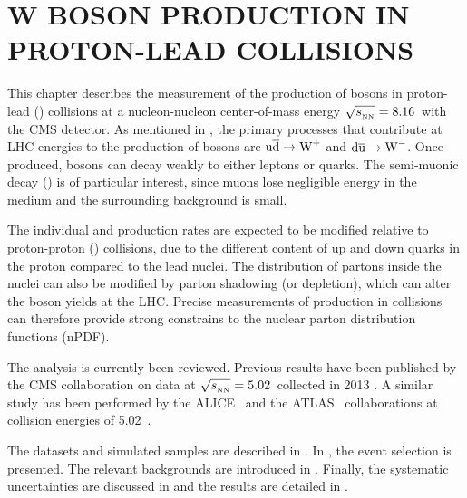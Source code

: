 \let\textcircled=\pgftextcircled
\chapter{W BOSON PRODUCTION IN PROTON-LEAD COLLISIONS} \label{sec:WBoson}


This chapter describes the measurement of the production of \W bosons in proton-lead (\pPb) collisions at a nucleon-nucleon center-of-mass energy $\sqrtsnn = 8.16$~\TeV with the CMS detector. As mentioned in , the primary processes that contribute at LHC energies to the production of \W bosons are $\text{u} \overline{\text{d}} \rightarrow \text{W}^+$ and $\text{d} \overline{\text{u}} \rightarrow \text{W}^-$. Once produced, \W bosons can decay weakly to either leptons or quarks. The semi-muonic decay (\WToMuNu) is of particular interest, since muons lose negligible energy in the medium and the surrounding background is small.

The individual \Wp and \Wm production rates are expected to be modified relative to proton-proton (\pp) collisions, due to the different content of up and down quarks in the proton compared to the lead nuclei. The distribution of partons inside the nuclei can also be modified by parton shadowing (or depletion), which can alter the \W boson yields at the LHC. Precise measurements of \W production in \pPb collisions can therefore provide strong constrains to the nuclear parton distribution functions (nPDF).

The analysis is currently been reviewed. Previous results have been published by the CMS collaboration on \pPb data at $\sqrtsnn = 5.02$~\TeV collected in 2013 \cite{HIN-13-007}. A similar study has been performed by the ALICE~\cite{ALICE_pPb_W_5TeV} and the ATLAS~\cite{ATLAS_pPb_W_5TeV} collaborations at \pPb collision energies of 5.02~\TeV.

The datasets and simulated samples are described in . In , the event selection is presented. The relevant backgrounds are introduced in . Finally, the systematic uncertainties are discussed in  and the results are detailed in .




\clearpage













\clearpage




\clearpage
